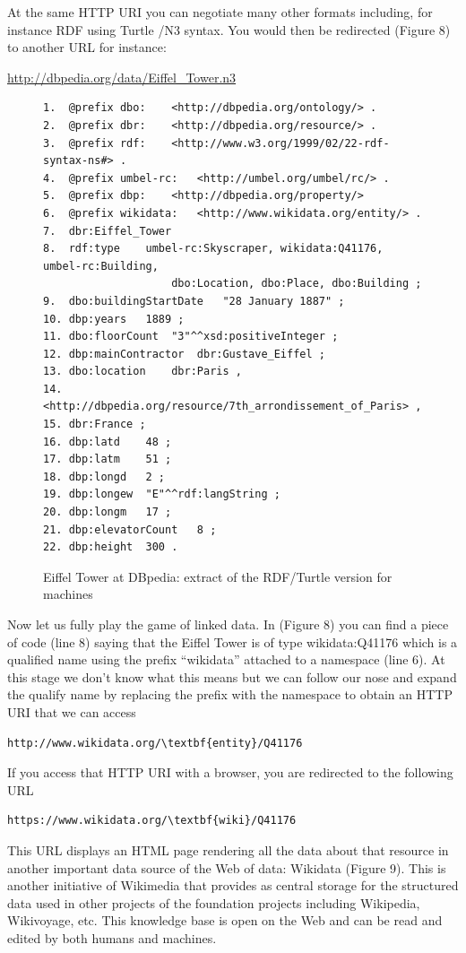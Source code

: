 At the same HTTP URI you can negotiate many other formats including, for
instance RDF using Turtle /N3 syntax. You would then be redirected
(Figure 8) to another URL for instance:

\url{http://dbpedia.org/data/Eiffel_Tower.n3}


\begin{figure}
 \begin{lstlisting}
1.	@prefix dbo:	<http://dbpedia.org/ontology/> .
2.	@prefix dbr:	<http://dbpedia.org/resource/> .
3.	@prefix rdf:	<http://www.w3.org/1999/02/22-rdf-syntax-ns#> .
4.	@prefix umbel-rc:	<http://umbel.org/umbel/rc/> .
5.	@prefix dbp:	<http://dbpedia.org/property/>
6.	@prefix wikidata:	<http://www.wikidata.org/entity/> .
7.	dbr:Eiffel_Tower
8.	rdf:type	umbel-rc:Skyscraper, wikidata:Q41176, umbel-rc:Building,
                    dbo:Location, dbo:Place, dbo:Building ;
9.	dbo:buildingStartDate	"28 January 1887" ;
10.	dbp:years	1889 ;
11.	dbo:floorCount	"3"^^xsd:positiveInteger ;
12.	dbp:mainContractor	dbr:Gustave_Eiffel ;
13.	dbo:location	dbr:Paris ,
14.	<http://dbpedia.org/resource/7th_arrondissement_of_Paris> ,
15.	dbr:France ;
16.	dbp:latd	48 ;
17.	dbp:latm	51 ;
18.	dbp:longd	2 ;
19.	dbp:longew	"E"^^rdf:langString ;
20.	dbp:longm	17 ;
21.	dbp:elevatorCount	8 ;
22.	dbp:height	300 .
 \end{lstlisting}
    \caption{Eiffel Tower at DBpedia: extract of the RDF/Turtle version for
machines}
    \label{fig:ch5.8}
\end{figure}

Now let us fully play the game of linked data. In (Figure 8) you can
find a piece of code (line 8) saying that the Eiffel Tower is of type
wikidata:Q41176 which is a qualified name using the prefix ``wikidata''
attached to a namespace (line 6). At this stage we don't know what this
means but we can follow our nose and expand the qualify name by
replacing the prefix with the namespace to obtain an HTTP URI that we
can access

\begin{lstlisting}
http://www.wikidata.org/\textbf{entity}/Q41176
\end{lstlisting}

If you access that HTTP URI with a browser, you are redirected to the
following URL

\begin{lstlisting}
https://www.wikidata.org/\textbf{wiki}/Q41176
\end{lstlisting}


This URL displays an HTML page rendering all the data about that
resource in another important data source of the Web of data: Wikidata
(Figure 9). This is another initiative of Wikimedia that provides as
central storage for the structured data used in other projects of the
foundation projects including Wikipedia, Wikivoyage, etc. This knowledge
base is open on the Web and can be read and edited by both humans and
machines.

